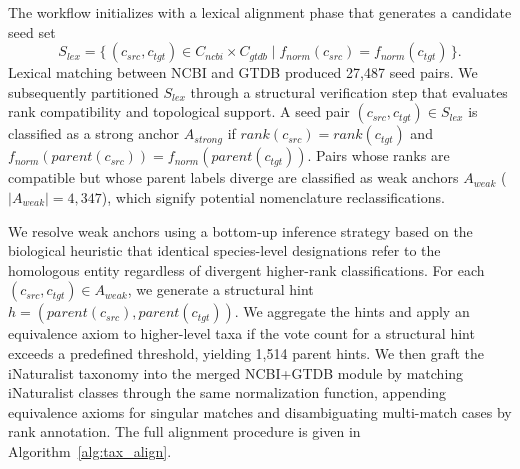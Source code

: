 \documentclass[11pt,a4paper]{article}
\begin{document}
The workflow initializes with a lexical alignment phase that
generates a candidate seed set
\[
S_{lex} = \{\,(c_{src}, c_{tgt}) \in C_{ncbi} \times C_{gtdb} \mid
  f_{norm}(c_{src}) = f_{norm}(c_{tgt})\,\}.
\]
Lexical matching between NCBI and GTDB produced 27{,}487 seed pairs.
We subsequently partitioned $S_{lex}$ through a structural
verification step that evaluates rank compatibility and topological
support. A seed pair $(c_{src}, c_{tgt}) \in S_{lex}$ is classified as
a strong anchor $A_{strong}$ if $\mathit{rank}(c_{src}) =
\mathit{rank}(c_{tgt})$ and $f_{norm}(\mathit{parent}(c_{src})) =
f_{norm}(\mathit{parent}(c_{tgt}))$. Pairs whose ranks are compatible
but whose parent labels diverge are classified as weak anchors
$A_{weak}$ ($|A_{weak}| = 4{,}347$), which signify potential
nomenclature reclassifications.

We resolve weak anchors using a bottom-up inference strategy based on
the biological heuristic that identical species-level designations
refer to the homologous entity regardless of divergent higher-rank
classifications. For each $(c_{src}, c_{tgt}) \in A_{weak}$, we
generate a structural hint
$h = (\mathit{parent}(c_{src}), \mathit{parent}(c_{tgt}))$. We
aggregate the hints and apply an equivalence axiom to higher-level
taxa if the vote count for a structural hint exceeds a predefined
threshold, yielding 1{,}514 parent hints. We then graft the
iNaturalist taxonomy into the merged NCBI+GTDB module by matching
iNaturalist classes through the same normalization function,
appending equivalence axioms for singular matches and disambiguating
multi-match cases by rank annotation. The full alignment procedure is
given in Algorithm~\ref{alg:tax_align}.
\end{document}
